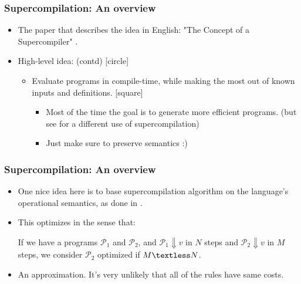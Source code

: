 \documentclass{beamer}
\begin{document}
\begin{frame}

    \frametitle{Supercompilation: An overview}

    \begin{itemize}
        \item The paper that describes the idea in English: "The Concept of a
            Supercompiler" \citet{Turchin86theconcept}.
        \item High-level idea: (contd)
            [circle]
            \begin{itemize}
                \item Evaluate programs in compile-time, while making the most
                    out of known inputs and definitions.
                    [square]
                    \begin{itemize}[<+->]
                        \item Most of the time the goal is to generate more
                            efficient programs. \newline
                            (but see \citet{Klyuchnikov2010proving} for a
                            different use of supercompilation)

                        \item Just make sure to preserve semantics :)
                    \end{itemize}
            \end{itemize}
    \end{itemize}

\end{frame}

\begin{frame}

    \frametitle{Supercompilation: An overview}

    \begin{itemize}[<+->]
        \item One nice idea here is to base supercompilation algorithm on the
            language's operational semantics, as done in \citet{SCbyEval}.

        \item This optimizes in the sense that:

            If we have a programs $\mathcal{P}_1$ and $\mathcal{P}_2$, and
            \newline
            $\mathcal{P}_1 \Downarrow v$ in $N$ steps and \newline
            $\mathcal{P}_2 \Downarrow v$ in $M$ steps, \newline
            we consider $\mathcal{P}_2$ optimized if $M \textless N$.

        \item An approximation. It's very unlikely that all of the rules have
            same costs.
    \end{itemize}

\end{frame}
\end{document}
